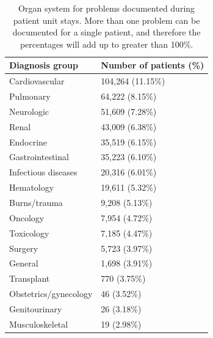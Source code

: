 \documentclass[english]{article}
\begin{document}

\begin{center}
\begin{table}
\begin{tabular}{l|p{4cm}}
Diagnosis group & Number of patients (\%) \\\hline
Cardiovascular                           & 104,264 (11.15\%) \\
Pulmonary                                & 64,222 (8.15\%) \\
Neurologic                               & 51,609 (7.28\%) \\
Renal                                    & 43,009 (6.38\%) \\
Endocrine                                & 35,519 (6.15\%) \\
Gastrointestinal                         & 35,223 (6.10\%) \\
Infectious diseases                      & 20,316 (6.01\%) \\
Hematology                               & 19,611 (5.32\%) \\
Burns/trauma                             & 9,208 (5.13\%) \\
Oncology                                 & 7,954 (4.72\%) \\
Toxicology                               & 7,185 (4.47\%) \\
Surgery                                  & 5,723 (3.97\%) \\
General                                  & 1,698 (3.91\%) \\
Transplant                               &   770 (3.75\%) \\
Obstetrics/gynecology                    &    46 (3.52\%) \\
Genitourinary                            &    26 (3.18\%) \\
Musculoskeletal                          &    19 (2.98\%) \\
\hline
\end{tabular}
\caption{Organ system for problems documented during patient unit stays. More than one problem can be documented for a single patient, and therefore the percentages will add up to greater than 100\%.
\label{tab:organ_system}}
\end{table}
\end{center}

\end{document}
